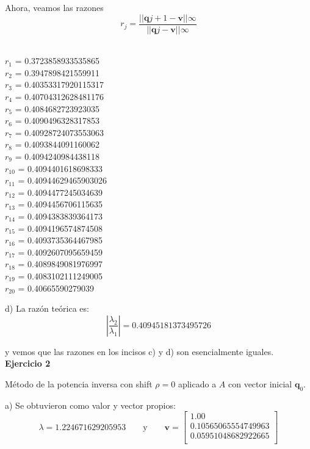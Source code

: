 \documentclass[11pt]{article}
\begin{document}
Ahora, veamos las razones
$$
r_j = \frac{||\textbf{q}{j+1} - \textbf{v}||\infty}{||\textbf{q}{j} - \textbf{v}||\infty}
$$
\\

\begin{multicols}{3}
\noindent
$r_1$ = 0.3723858933535865 \\
$r_2$ = 0.3947898421559911 \\
$r_3$ = 0.40353317920115317 \\
$r_4$ = 0.40704312628481176 \\
$r_5$ = 0.4084682723923035 \\
$r_6$ = 0.4090496328317853 \\
$r_7$ = 0.40928724073553063 \\
$r_8$ = 0.4093844091160062 \\
$r_9$ = 0.4094240984438118 \\
$r_{10}$ = 0.4094401618698333 \\
$r_{11}$ = 0.40944629465903026 \\
$r_{12}$ = 0.4094477245034639 \\
$r_{13}$ = 0.4094456706115635 \\
$r_{14}$ = 0.4094383839364173 \\
$r_{15}$ = 0.4094196574874508 \\
$r_{16}$ = 0.4093735364467985 \\
$r_{17}$ = 0.4092607095659459 \\
$r_{18}$ = 0.4089849081976997 \\
$r_{19}$ = 0.4083102111249005 \\
$r_{20}$ = 0.40665590279039 \\
\end{multicols}



d) La razón teórica es:
$$
\left| \frac{\lambda_2}{\lambda_1} \right| = 0.40945181373495726
$$

y vemos que las razones en los incisos c) y d) son esencialmente iguales.
\\

\newpage
\noindent
\textbf{Ejercicio 2}

\noindent
Método de la potencia inversa con shift $\rho = 0$ aplicado a $A$ con vector inicial $\textbf{q}_0$.

a) Se obtuvieron como valor y vector propios:
 \[
 \lambda = 1.224671629205953
 \qquad\text{y}\qquad
 \textbf{v} = \begin{bmatrix}
1.00 \\
0.10565065554749963 \\
0.05951048682922665 \\
\end{bmatrix}
 \]
 \\
 \\
\end{document}
